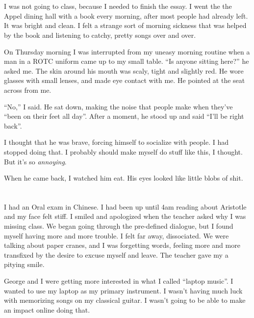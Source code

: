 \section{}

I was not going to class, because I needed to finish the essay.  I went the the
Appel dining hall with a book every morning, after most people had already left.
It was bright and clean.  I felt a strange sort of morning sickness that was
helped by the book and listening to catchy, pretty songs over and over.  

On Thursday morning I was interrupted from my uneasy morning routine when a man
in a ROTC uniform came up to my small table.  ``Is anyone sitting here?'' he
asked me.  The skin around his mouth was scaly, tight and slightly red.  He wore
glasses with small lenses, and made eye contact with me.  He pointed at the seat
across from me.  

``No,'' I said.  He sat down, making the noise that people make when they've
``been on their feet all day''.  After a moment, he stood up and said ``I'll be
right back''.  

I thought that he was brave, forcing himself to socialize with people.  I had
stopped doing that.  I probably should make myself do stuff like this, I
thought.  But it's so \textit{annoying}. 

When he came back, I watched him eat.  His eyes looked like little blobs of
shit.

\section{}

I had an Oral exam in Chinese.  I had been up until 4am reading about Aristotle
and my face felt stiff.  I smiled and apologized when the teacher asked why I
was missing class.  We began going through the pre-defined dialogue, but I
found myself having more and more trouble.  I felt far away, dissociated.  We
were talking about paper cranes, and I was forgetting words, feeling more and
more transfixed by the desire to excuse myself and leave.  The teacher gave my
a pitying smile.  

George and I were getting more interested in what I called ``laptop music''.  I
wanted to use my laptop as my primary instrument.  I wasn't having much luck
with memorizing songs on my classical guitar.  I wasn't going to be able to make
an impact online doing that.  


